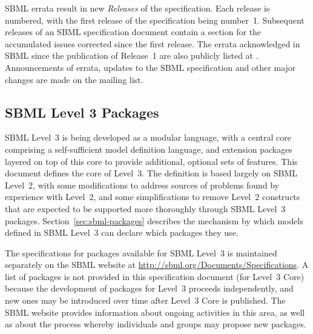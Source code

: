 SBML errata result in new \emph{Releases} of the specification.
Each release is numbered, with the first release of the
specification being number~1.  Subsequent releases of an SBML
specification document contain a section for the accumulated
issues corrected since the first release.  The errata acknowledged
in SBML \thisLV since the publication of Release~1 are also
publicly listed at
.
Announcements of errata, updates to the SBML specification and
other major changes are made on the
 mailing
list.


\subsection{SBML Level 3 Packages}
\label{sec:packages}

SBML Level~3 is being developed as a modular language, with a
central core comprising a self-sufficient model definition
language, and extension packages layered on top of this core to
provide additional, optional sets of features.  This document
defines the core of Level~3.  The definition is based largely on
SBML Level~2, with some modifications to address sources of
problems found by experience with Level~2, and some
simplifications to remove Level~2 constructs that are expected to
be supported more thoroughly through SBML Level~3 packages.
Section~\ref{sec:sbml-packages} describes the mechanism by which
models defined in SBML Level~3 can declare which packages they
use.  

The specifications for packages available for SBML Level~3 is
maintained separately on the SBML website at
\url{http://sbml.org/Documents/Specifications}.  A list of
packages is not provided in this specification document (\ie for
Level~3 Core) because the development of packages for Level~3
proceeds independently, and new ones may be introduced over time
after Level~3 Core is published.  The SBML website provides
information about ongoing activities in this area, as well as
about the process whereby individuals and groups may propose new
packages.


